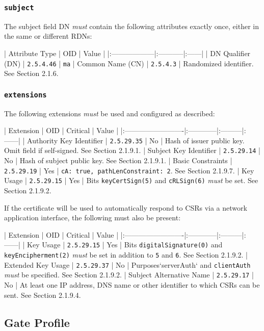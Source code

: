 \subsubsection{\texttt{subject}}

The subject field DN \textit{must} contain the following attributes exactly once, either in the same or different RDNs:

| Attribute Type    | OID        | Value |
|:------------------|:-----------|:------|
| DN Qualifier (DN) | \texttt{2.5.4.46} | \texttt{ma}
| Common Name (CN)  | \texttt{2.5.4.3}  |  Randomized identifier. See Section 2.1.6.

\subsubsection{\texttt{extensions}}

The following extensions \textit{must} be used and configured as described:

| Extension                | OID         | Critical | Value |
|:-------------------------|:------------|:---------|:------|
| Authority Key Identifier | \texttt{2.5.29.35} | No       | Hash of issuer public key. Omit field if self-signed. See Section 2.1.9.1.
| Subject Key Identifier   | \texttt{2.5.29.14} | No       | Hash of subject public key. See Section 2.1.9.1.
| Basic Constraints        | \texttt{2.5.29.19} | Yes      | \texttt{cA: true, pathLenConstraint: 2}. See Section 2.1.9.7.
| Key Usage                | \texttt{2.5.29.15} | Yes      | Bits \texttt{keyCertSign(5)} and \texttt{cRLSign(6)} \textit{must} be set. See Section 2.1.9.2.

If the certificate will be used to automatically respond to CSRs via a network application interface, the following must also be present:

| Extension                | OID         | Critical | Value |
|:-------------------------|:------------|:---------|:------|
| Key Usage                | \texttt{2.5.29.15} | Yes      | Bits \texttt{digitalSignature(0)} and \texttt{keyEncipherment(2)} \textit{must} be set in addition to \texttt{5} and \texttt{6}. See Section 2.1.9.2.
| Extended Key Usage       | \texttt{2.5.29.37} | No       | Purposes`serverAuth` and \texttt{clientAuth} \textit{must} be specified. See Section 2.1.9.2.
| Subject Alternative Name | \texttt{2.5.29.17} | No       | At least one IP address, DNS name or other identifier to which CSRs can be sent. See Section 2.1.9.4.

\subsection{Gate Profile}

